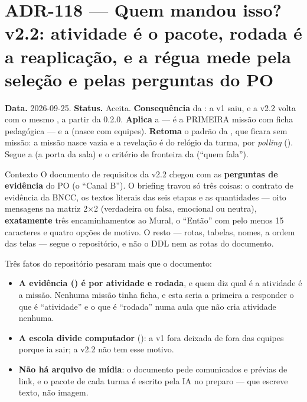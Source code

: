 \section{ADR-118 --- Quem mandou isso? v2.2: atividade é o pacote, rodada é a reaplicação, e a régua mede pela seleção e pelas perguntas do PO}
\label{adr:exp05ef1b-v2}

\textbf{Data.} 2026-09-25. \textbf{Status.} Aceita.
\textbf{Consequência} da : a v1 saiu, e a v2.2 volta com o mesmo
, a partir da 0.2.0. \textbf{Aplica} a  --- é a
PRIMEIRA missão com ficha pedagógica --- e a  (nasce com
equipes). \textbf{Retoma} o padrão da , que ficara sem missão: a
missão nasce vazia e a revelação é do relógio da turma, por \emph{polling}
(). Segue a  (a porta da sala) e o critério de
fronteira da  (\enquote{quem fala}).

\begin{especificacao}{Contexto}
O documento de requisitos da v2.2 chegou com as \textbf{perguntas de evidência}
do PO (o \enquote{Canal B}). O briefing travou só três coisas: o contrato de
evidência da BNCC, os textos literais das seis etapas e as quantidades --- oito
mensagens na matriz 2$\times$2 (verdadeira ou falsa, emocional ou neutra),
\textbf{exatamente} três encaminhamentos ao Mural, o \enquote{Então} com pelo
menos 15 caracteres e quatro opções de motivo. O resto --- rotas, tabelas,
nomes, a ordem das telas --- segue o repositório, e não o DDL nem as rotas do
documento.

Três fatos do repositório pesaram mais que o documento:

\begin{itemize}
  \item \textbf{A evidência () é por atividade e rodada}, e quem
    diz qual é a atividade é a missão. Nenhuma missão tinha ficha, e esta seria a
    primeira a responder o que é \enquote{atividade} e o que é \enquote{rodada}
    numa aula que não cria atividade nenhuma.
  \item \textbf{A escola divide computador} (): a v1 fora deixada
    de fora das equipes porque ia sair; a v2.2 não tem esse motivo.
  \item \textbf{Não há arquivo de mídia}: o documento pede comunicados e prévias
    de link, e o pacote de cada turma é escrito pela IA no preparo --- que
    escreve texto, não imagem.
\end{itemize}
\end{especificacao}


